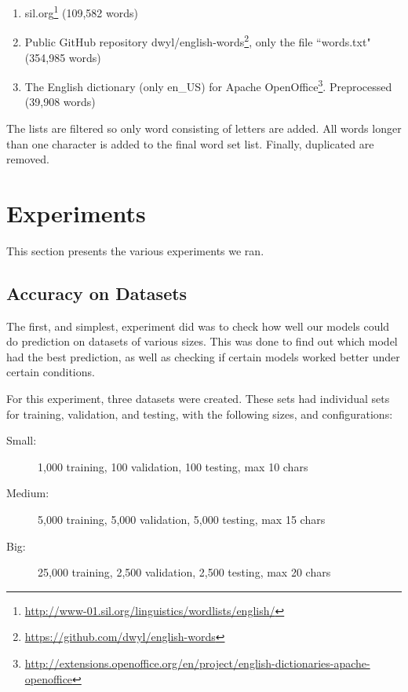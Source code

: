 \begin{enumerate}
    \item sil.org\footnote{\url{http://www-01.sil.org/linguistics/wordlists/english/}} (109,582 words)
    \item Public GitHub repository dwyl/english-words\footnote{\url{https://github.com/dwyl/english-words}}, only the file ``words.txt" (354,985 words) 
    \item The English dictionary (only en\_US) for Apache OpenOffice\footnote{\url{http://extensions.openoffice.org/en/project/english-dictionaries-apache-openoffice}}. Preprocessed (39,908 words)
\end{enumerate}

The lists are filtered so only word consisting of letters are added. All words longer than one character is added to the final word set list. Finally, duplicated are removed.


\section{Experiments}
This section presents the various experiments we ran.

\subsection{Accuracy on Datasets}
\label{sec:accuracy_on_datasets}
The first, and simplest, experiment did was to check how well our models could do prediction on datasets of various sizes. This was done to find out which model had the best prediction, as well as checking if certain models worked better under certain conditions.

For this experiment, three datasets were created. These sets had individual sets for training, validation, and testing, with the following sizes, and configurations:

\vspace{0.5cm}
\begin{minipage}{0.8\linewidth}
    \begin{description}
        \item[Small:]{1,000 training, 100 validation, 100 testing, max 10 chars}
        \item[Medium:]{5,000 training, 5,000 validation, 5,000 testing, max 15 chars}
        \item[Big:]{25,000 training, 2,500 validation, 2,500 testing, max 20 chars}
    \end{description}
\end{minipage}

